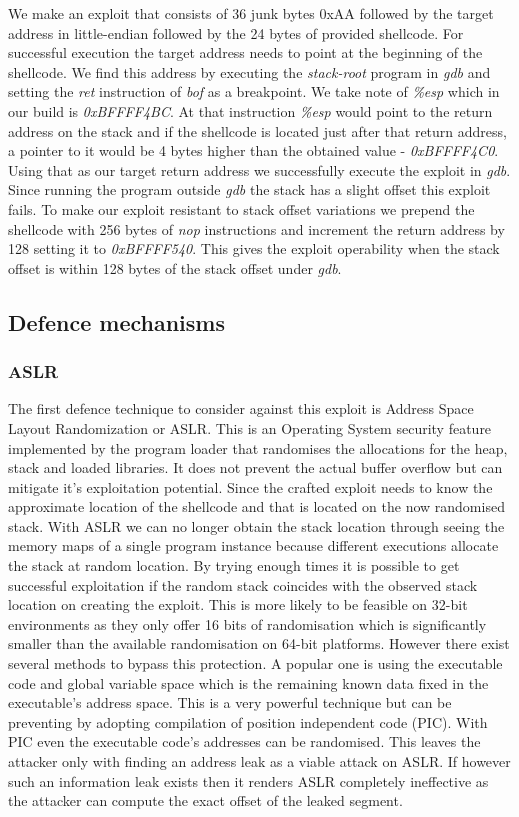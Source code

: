 We make an exploit that consists of 36 junk bytes 0xAA followed by the target address in little-endian followed by the 24 bytes of provided shellcode. For successful execution the target address needs to point at the beginning of the shellcode. We find this address by executing the \emph{stack-root} program in \emph{gdb} and setting the \emph{ret} instruction of \emph{bof} as a breakpoint. We take note of \emph{\%esp} which in our build is \emph{0xBFFFF4BC}. At that instruction \emph{\%esp} would point to the return address on the stack and if the shellcode is located just after that return address, a pointer to it would be 4 bytes higher than the obtained value - \emph{0xBFFFF4C0}. Using that as our target return address we successfully execute the exploit in \emph{gdb}. Since running the program outside \emph{gdb} the stack has a slight offset this exploit fails. To make our exploit resistant to stack offset variations we prepend the shellcode with 256 bytes of \emph{nop} instructions and increment the return address by 128 setting it to \emph{0xBFFFF540}. This gives the exploit operability when the stack offset is within 128 bytes of the stack offset under \emph{gdb}.

\subsection{Defence mechanisms}
\subsubsection{ASLR}
The first defence technique to consider against this exploit is Address Space Layout Randomization or ASLR. This is an Operating System security feature implemented by the program loader that randomises the allocations for the heap, stack and loaded libraries. It does not prevent the actual buffer overflow but can mitigate it's exploitation potential. Since the crafted exploit needs to know the approximate location of the shellcode and that is located on the now randomised stack. With ASLR we can no longer obtain the stack location through seeing the memory maps of a single program instance because different executions allocate the stack at random location. By trying enough times it is possible to get successful exploitation if the random stack coincides with the observed stack location on creating the exploit. This is more likely to be feasible on 32-bit environments as they only offer 16 bits of randomisation which is significantly smaller than the available randomisation on 64-bit platforms. However there exist several methods to bypass this protection. A popular one is using the executable code and global variable space  which is the remaining known data fixed in the executable's address space. This is a very powerful technique but can be preventing by adopting compilation of position independent code (PIC). With PIC even the executable code's addresses can be randomised. This leaves the attacker only with finding an address leak as a viable attack on ASLR. If however such an information leak exists then it renders ASLR completely ineffective as the attacker can compute the exact offset of the leaked segment.\\
